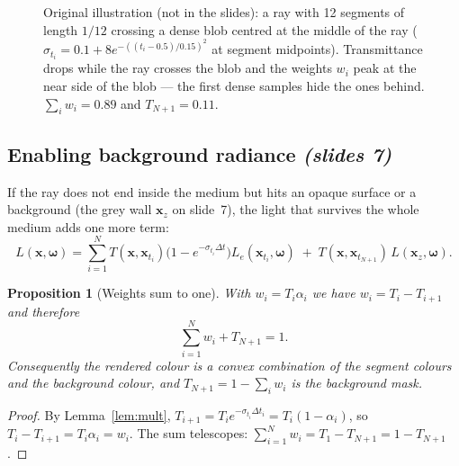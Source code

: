 \documentclass[11pt,a4paper]{article}
\newcommand{\xx}{\boldsymbol{x}}
\newcommand{\om}{\boldsymbol{\omega}}
\newcommand{\Le}{L_e}
\newcommand{\sref}[1]{\texorpdfstring{\emph{(slides #1)}}{(slides #1)}}
\theoremstyle{definition}
\theoremstyle{plain}
\newtheorem{proposition}{Proposition}[section]
\begin{document}
\begin{figure}[H]
\centering
{}
\caption{Original illustration (not in the slides): a ray with 12 segments of length $1/12$ crossing a dense blob centred at the middle of the ray ($\sigma_{t_i}=0.1+8e^{-((t_i-0.5)/0.15)^2}$ at segment midpoints). Transmittance drops while the ray crosses the blob and the weights $w_i$ peak at the near side of the blob --- the first dense samples hide the ones behind. $\sum_iw_i=0.89$ and $T_{N+1}=0.11$.}
\end{figure}

\subsection{Enabling background radiance \sref{7}}

If the ray does not end inside the medium but hits an opaque surface or a background (the grey wall $\xx_z$ on slide~7), the light that survives the whole medium adds one more term:
\[
L(\xx,\om)=\sum_{i=1}^{N}T(\xx,\xx_{t_i})\big(1-e^{-\sigma_{t_i}\Delta t}\big)\Le(\xx_{t_i},\om)\;+\;T(\xx,\xx_{t_{N+1}})\,L(\xx_z,\om).
\]

\begin{proposition}[Weights sum to one]\label{prop:sum1}
With $w_i=T_i\alpha_i$ we have $w_i=T_i-T_{i+1}$ and therefore
\[
\sum_{i=1}^{N}w_i+T_{N+1}=1 .
\]
Consequently the rendered colour is a \emph{convex combination} of the segment colours and the background colour, and $T_{N+1}=1-\sum_iw_i$ is the \emph{background mask}.
\end{proposition}
\begin{proof}
By Lemma~\ref{lem:mult}, $T_{i+1}=T_ie^{-\sigma_{t_i}\Delta t_i}=T_i(1-\alpha_i)$, so $T_i-T_{i+1}=T_i\alpha_i=w_i$. The sum telescopes: $\sum_{i=1}^Nw_i=T_1-T_{N+1}=1-T_{N+1}$.
\end{proof}
\end{document}
